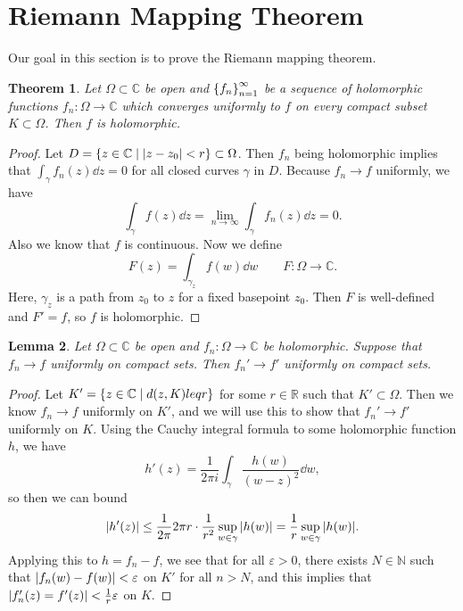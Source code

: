 \documentclass[leqno, openany]{memoir}
\newtheorem{thm}{Theorem}[section]
\newtheorem{lem}[thm]{Lemma}
\theoremstyle{definition}
\theoremstyle{remark}
\theoremstyle{plain}
\theoremstyle{definition}
\theoremstyle{remark}
\newcommand{\R}{\mathbb{R}}
\newcommand{\C}{\mathbb{C}}
\newcommand{\N}{\mathbb{N}}
\newcommand{\ep}{\varepsilon}
\begin{document}
\section{Riemann Mapping Theorem}%

Our goal in this section is to prove the Riemann mapping theorem.

\begin{thm} Let $\Omega \subset \C$ be open and $\qty{f_n}_{n=1}^{\infty}$ be a
    sequence of holomorphic functions $f_n \colon \Omega \to \C$ which
    converges uniformly to $f$ on every compact subset $K \subset \Omega$. Then
    $f$ is holomorphic.  \end{thm}

\begin{proof} Let $D = \qty{z \in \C \mid \abs{z - z_0} < r} \subset \Omega$.
    Then $f_n$ being holomorphic implies that $\int_{\gamma} f_n(z) \dd{z} = 0$
    for all closed curves $\gamma$ in $D$. Because $f_n \to f$ uniformly, we
    have \[ \int_{\gamma} f(z) \dd{z} = \lim_{n \to \infty} \int_{\gamma}
    f_n(z) \dd{z} = 0. \] Also we know that $f$ is continuous. Now we define \[
F(z) = \int_{\gamma_z} f(w) \dd{w} \qquad F \colon \Omega \to \C. \] Here,
$\gamma_z$ is a path from $z_0$ to $z$ for a fixed basepoint $z_0$. Then $F$ is
well-defined and $F' = f$, so $f$ is holomorphic.  \end{proof}

\begin{lem} Let $\Omega \subset \C$ be open and $f_n \colon \Omega \to \C$ be
holomorphic. Suppose that $f_n \to f$ uniformly on compact sets. Then $f_n' \to
f'$ uniformly on compact sets.  \end{lem}

\begin{proof} Let $K' = \qty{z \in \C \mid d(z,K) leq r}$ for some $r \in \R$
    such that $K' \subset \Omega$. Then we know $f_n \to f$ uniformly on $K'$,
    and we will use this to show that $f_n' \to f'$ uniformly on $K$. Using the
    Cauchy integral formula to some holomorphic function $h$, we have \[ h'(z)
        = \frac{1}{2 \pi i} \int_{\gamma} \frac{h(w)}{{(w-z)}^2} \dd{w}, \] so
        then we can bound \[ \abs{h'(z)} \leq \frac{1}{2\pi} 2 \pi r \cdot
        \frac{1}{r^2} \sup_{w \in \gamma} \abs{h(w)} = \frac{1}{r} \sup_{w \in
    \gamma} \abs{h(w)}. \] Applying this to $h = f_n - f$, we see that for all
    $\ep > 0$, there exists $N \in \N$ such that $\abs{f_n(w) - f(w)} < \ep$ on
    $K'$ for all $n > N$, and this implies that $\abs{f_n'(z) = f'(z)} <
    \frac{1}{r} \ep$ on $K$.  \end{proof}
\end{document}
